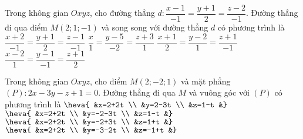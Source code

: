 \begin{ex}%
	Trong không gian $Oxyz$, cho đường thẳng $d\colon \dfrac{x-1}{-1}=\dfrac{y+1}{2}=\dfrac{z-2}{-1}$. Đường thẳng đi qua điểm $M(2; 1;-1)$ và song song với đường thẳng $d$ có phương trình là
	\choice
	{$\dfrac{x+2}{-1}=\dfrac{y+1}{2}=\dfrac{z-1}{-1}$}
	{\True $\dfrac{x}{1}=\dfrac{y-5}{-2}=\dfrac{z+3}{1}$}
	{$\dfrac{x+1}{2}=\dfrac{y-2}{1}=\dfrac{z+1}{-1}$}
	{$\dfrac{x-2}{1}=\dfrac{y-1}{-1}=\dfrac{z+1}{2}$}
\end{ex}
\begin{ex}%
	Trong không gian $Oxyz$, cho điểm $M(2;-2; 1)$ và mặt phẳng $(P)\colon 2x-3y-z+1=0$. Đường thẳng đi qua $M$ và vuông góc với $(P)$ có phương trình là
	\choice
	{$\heva{	&x=2+2t \\
			&y=2-3t \\
			&z=1-t
			&}$}
	{\True $\heva{	&x=2+2t \\
			&y=-2-3t \\
			&z=1-t
			&}$}
	{$\heva{	&x=2+2t \\
			&y=-2+3t \\
			&z=1+t
			&}$}
	{$\heva{	&x=2+2t \\
			&y=-3-2t \\
			&z=-1+t
			&}$}
\end{ex}
